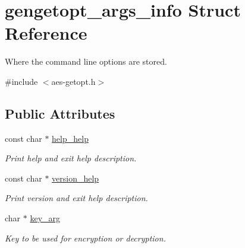 \hypertarget{structgengetopt__args__info}{}\section{gengetopt\+\_\+args\+\_\+info Struct Reference}
\label{structgengetopt__args__info}


Where the command line options are stored.  




{\ttfamily \#include $<$aes-\/getopt.\+h$>$}

\subsection*{Public Attributes}
\begin{DoxyCompactItemize}
\item 
\mbox{\label{structgengetopt__args__info_afb4efa68a6f43a4d112e9b96ffe89101}} 
const char $\ast$ \hyperlink{structgengetopt__args__info_afb4efa68a6f43a4d112e9b96ffe89101}{help\+\_\+help}
\begin{DoxyCompactList}\small\item\em Print help and exit help description. \end{DoxyCompactList}\item 
\mbox{\label{structgengetopt__args__info_adef454ea6f3ff4114ae5009e58360cfc}} 
const char $\ast$ \hyperlink{structgengetopt__args__info_adef454ea6f3ff4114ae5009e58360cfc}{version\+\_\+help}
\begin{DoxyCompactList}\small\item\em Print version and exit help description. \end{DoxyCompactList}\item 
\mbox{\label{structgengetopt__args__info_a9d2e2cfeae6c1b4644a9e539dd37b490}} 
char $\ast$ \hyperlink{structgengetopt__args__info_a9d2e2cfeae6c1b4644a9e539dd37b490}{key\+\_\+arg}
\begin{DoxyCompactList}\small\item\em Key to be used for encryption or decryption. \end{DoxyCompactList}\item 
\mbox{\label{structgengetopt__args__info_a46fe55fd04263db7ebf4d5afa09f696f}} 

\end{DoxyCompactItemize}
